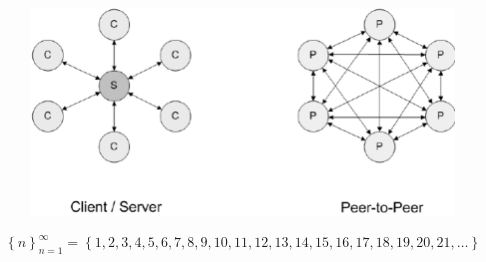 \documentclass[10pt,twocolumn,twoside,czech,a4paper]{article}
\begin{document}
\begin{figure}[h]
	\centering
	\includegraphics[width=1.0\textwidth]{client-server-vs-p2p.png}
\end{figure}

\begin{equation*}
	\left\{n\right\}^{\infty}_{n=1}=\left\{1,2,3,4,5,6,7,8,9,10,11,12,13,14,15,16,17,18,19,20,21,\ldots\right\}
\end{equation*}	


\end{document}
